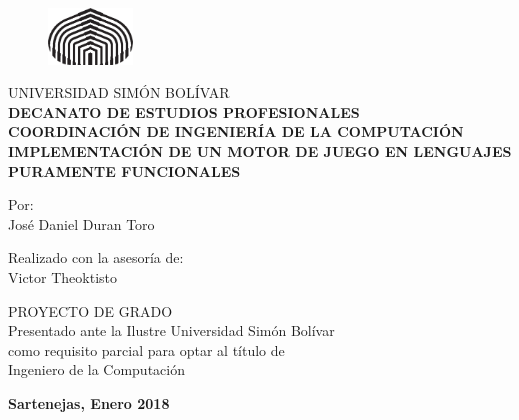\documentclass[letterpaper,12pt,times,oneside,numbered,print,index,custommargin,PageStyleI]{Classes/PhDThesisPSnPDF}
\begin{document}

\frontmatter

\graphicspath{{Figs/}}
\begin{titlepage}

\begin{figure}[!htbp!]
\centering
\includegraphics[width=0.2\textwidth]{University_Crest}
\end{figure}

\begin{center}

\Large UNIVERSIDAD SIMÓN BOLÍVAR\\
\large \textbf {DECANATO DE ESTUDIOS PROFESIONALES}\\
\large \textbf {COORDINACIÓN DE INGENIERÍA DE LA COMPUTACIÓN}\\

\vfill
\large \textbf {IMPLEMENTACIÓN DE UN MOTOR DE JUEGO EN LENGUAJES PURAMENTE FUNCIONALES}

\vfill
Por:\\
José Daniel Duran Toro

\vfill
Realizado con la asesoría de:\\
Victor Theoktisto

\vfill
\large PROYECTO DE GRADO\\
Presentado ante la Ilustre Universidad Simón Bolívar\\
como requisito parcial para optar al título de\\
Ingeniero de la Computación

\vfill
\textbf {Sartenejas, Enero 2018}


\end{center}

\end{titlepage}


%
%
%

\end{document}

